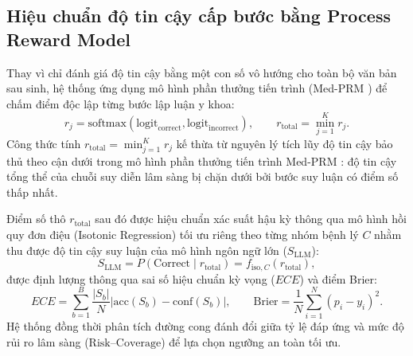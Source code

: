\subsection{Hiệu chuẩn độ tin cậy cấp bước bằng Process Reward Model}
Thay vì chỉ đánh giá độ tin cậy bằng một con số vô hướng cho toàn bộ văn bản sau sinh, hệ thống ứng dụng mô hình phần thưởng tiến trình (Med-PRM \cite{medprm2024}) để chấm điểm độc lập từng bước lập luận y khoa:
\begin{equation}
    r_j = \mathrm{softmax}(\mathrm{logit}_{\mathrm{correct}}, \mathrm{logit}_{\mathrm{incorrect}}), \qquad r_{\mathrm{total}} = \min_{j=1}^K r_j.
\end{equation}
Công thức tính $r_{\mathrm{total}} = \min_{j=1}^K r_j$ kế thừa từ nguyên lý tích lũy độ tin cậy bảo thủ theo cận dưới trong mô hình phần thưởng tiến trình Med-PRM \cite{medprm2024}: độ tin cậy tổng thể của chuỗi suy diễn lâm sàng bị chặn dưới bởi bước suy luận có điểm số thấp nhất.

Điểm số thô $r_{\mathrm{total}}$ sau đó được hiệu chuẩn xác suất hậu kỳ thông qua mô hình hồi quy đơn điệu (Isotonic Regression) tối ưu riêng theo từng nhóm bệnh lý $C$ nhằm thu được độ tin cậy suy luận của mô hình ngôn ngữ lớn ($S_{\mathrm{LLM}}$):
\begin{equation}
    S_{\mathrm{LLM}} = P(\mathrm{Correct} \mid r_{\mathrm{total}}) = f_{\mathrm{iso}, C}(r_{\mathrm{total}}),
\end{equation}
được định lượng thông qua sai số hiệu chuẩn kỳ vọng ($ECE$) và điểm Brier:
\begin{equation}
    ECE = \sum_{b=1}^B \frac{|S_b|}{N} \big| \mathrm{acc}(S_b) - \mathrm{conf}(S_b) \big|, \qquad \mathrm{Brier} = \frac{1}{N}\sum_{i=1}^N (p_i - y_i)^2.
\end{equation}
Hệ thống đồng thời phân tích đường cong đánh đổi giữa tỷ lệ đáp ứng và mức độ rủi ro lâm sàng ($\mathrm{Risk\text{--}Coverage}$) để lựa chọn ngưỡng an toàn tối ưu.

